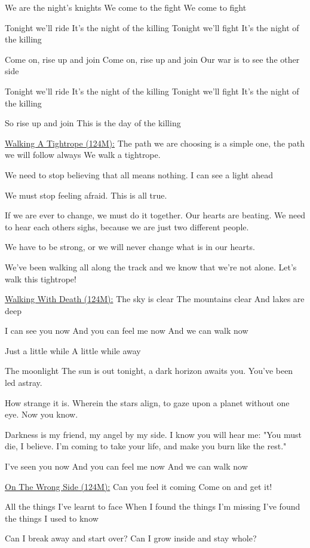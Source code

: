 \documentclass[11pt]{article}
\begin{document}
We are the night's knights
We come to the fight
We come to fight

Tonight we'll ride
It's the night of the killing
Tonight we'll fight
It's the night of the killing

Come on, rise up and join
Come on, rise up and join
Our war is to see the other side

Tonight we'll ride
It's the night of the killing
Tonight we'll fight
It's the night of the killing

So rise up and join
This is the day of the killing

\underline{Walking A Tightrope (124M):}
The path we are choosing is a simple one,
the path we will follow always
We walk a tightrope.

We need to stop believing
that all means nothing.
I can see a light ahead

We must stop feeling afraid.
This is all true.

If we are ever to change, we must do it together.
Our hearts are beating.
We need to hear each others sighs,
because we are just two different people.

We have to be strong,
or we will never change
what is in our hearts.

We've been walking all along the track
and we know that we're not alone.
Let's walk this tightrope!

\underline{Walking With Death (124M):}
The sky is clear
The mountains clear
And lakes are deep

I can see you now
And you can feel me now
And we can walk now

Just a little while
A little while away

The moonlight
The sun is out tonight,
a dark horizon awaits you.
You've been led astray.

How strange it is.
Wherein the stars align,
to gaze upon a planet without
one eye.
Now you know.

Darkness is my friend,
my angel by my side.
I know you will hear me:
"You must die, I believe.
I'm coming to take your life,
and make you burn like the rest."

I've seen you now
And you can feel me now
And we can walk now

\underline{On The Wrong Side (124M):}
Can you feel it coming
Come on and get it!

All the things I've learnt to face
When I found the things I'm missing
I've found the things I used to know

Can I break away and start over?
Can I grow inside and stay whole?
\end{document}
